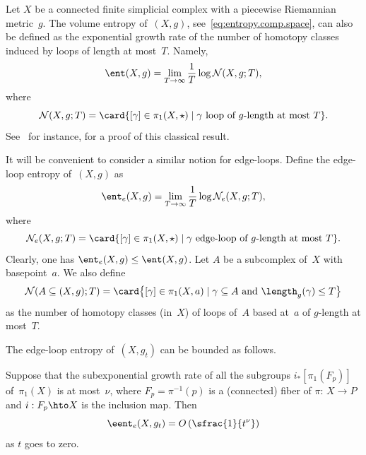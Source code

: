 \begin{definition} \label{def:entN}
Let $X$ be a connected finite simplicial complex with a piecewise Riemannian metric~$g$.
The volume entropy of~$(X,g)$, see~\eqref{eq:entropy.comp.space}, can also be defined as the exponential growth rate of the number of homotopy classes induced by loops of length at most~$T$.\vspace*{-3pt}
Namely,
\begin{equation} \label{eq:entN}
\ent(X,g) = \lim_{T \to \infty} \frac{1}{T} \log \mathcal{N}(X,g; T),
\end{equation}
where\vspace*{-5pt}
\[
\mathcal{N}(X,g;T) = \card \{[\gamma] \in \pi_1(X,\star) \mid \gamma \mbox{ loop of } g\mbox{-length at most } T\}.
\]
See~\cite[Lem.\,2.3]{sab} for instance, for a proof of this classical result.

It will be convenient to consider a similar notion for edge-loops.
Define the edge-loop entropy of~$(X,g)$ as\vspace*{-3pt}
\[
\ent_e(X,g) = \lim_{T \to \infty} \frac{1}{T} \log \mathcal{N}_e(X,g;T),
\]
where
\[
\mathcal{N}_e(X,g;T) = \card \{[\gamma] \in \pi_1(X,\star) \mid \gamma \mbox{ edge-loop of } g\mbox{-length at most } T\}.
\]
Clearly, one has $\ent_e(X,g) \leq \ent(X,g)$. Let $A$ be a subcomplex of~$X$ with basepoint~$a$.
We also define\vspace*{-3pt}
\[
\mathcal{N}(A \subseteq (X,g); T) = \card \! \left\{[\gamma] \in \pi_1(X,a) \mid \gamma \subseteq A \mbox{ and } \length_g(\gamma) \leq T \right\}
\]
as the number of homotopy classes (in~$X$) of loops of~$A$ based at~$a$ of $g$-length at most~$T$.
\end{definition}

The edge-loop entropy of~$(X,g_t)$ can be bounded as follows.

\begin{proposition} \label{prop:log}
Suppose that the subexponential growth rate of all the subgroups $i_*[\pi_1(F_p)]$ of~$\pi_1(X)$ is at most~$\nu$, where $F_p=\pi^{-1}(p)$ is a (connected) fiber of \hbox{$\pi{:}\,X\!\to\! P$} and $i:F_p \hto X$ is the inclusion map.
Then\vspace*{-3pt}
\begin{equation} \label{eq:log}
\eent_e(X,g_t) = O \left(\sfrac{1}{t^\nu} \right)
\end{equation}
as $t$ goes to zero.
\end{proposition}

